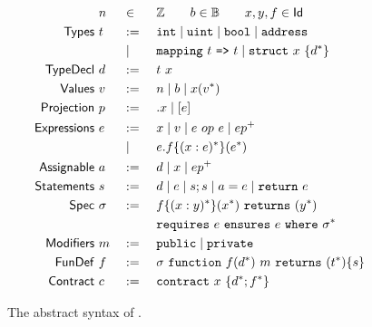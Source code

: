 \begin{figure}
  \begin{alignat*}{3}
    &~ n && \in && \mathbb{Z} \qquad b \in \mathbb{B} \qquad x,y,f \in \mathsf{Id}   \\
    \mathsf{Types} &~ t && :=\ && \texttt{int} \mid \texttt{uint} \mid \texttt{bool} \mid \texttt{address} \\
                &~   && \mid\ && \texttt{mapping} ~t~ \texttt{=>} ~t \mid \texttt{struct} ~x~ \{ d^* \} \\
    \mathsf{TypeDecl}    &~ d && :=\ && t ~ x \\
    \mathsf{Values}      &~ v && :=\ && n \mid b \mid x(v^*) \\
    \mathsf{Projection}  &~ p && :=\ && .x \mid [e] \\
    \mathsf{Expressions} &~ e && :=\ && x \mid v \mid e ~op~ e \mid e p^+ \\
                      &~   && \mid\ && e.f\{(x: e)^*\}(e^*) \\
    \mathsf{Assignable}  &~ a && :=\ && d \mid x \mid e p^+ \\
    \mathsf{Statements}  &~ s && :=\ && d \mid e \mid s; s \mid a = e \mid \texttt{return}~ e \\
    \mathsf{Spec}        &~ \sigma && :=\ && f\{(x : y)^*\}(x^*) ~\texttt{returns}~ (y^*) \\
                      &~        &&     && \texttt{requires}~ e ~\texttt{ensures}~ e ~\texttt{where}~ \sigma^* \\
    \mathsf{Modifiers}   &~ m && :=\ && \texttt{public} \mid \texttt{private} \\
    \mathsf{FunDef}      &~ f && :=\ && \sigma ~\texttt{function}~ f(d^*) ~ m ~\texttt{returns}~ (t^*) \{ s \} \\
    \mathsf{Contract}    &~ c && :=\ && \texttt{contract}~ x~ \{ d^*; f^* \}
  \end{alignat*}
  \caption{The abstract syntax of \lang.}
  \label{fig:syntax}
\end{figure}

\iffalse

